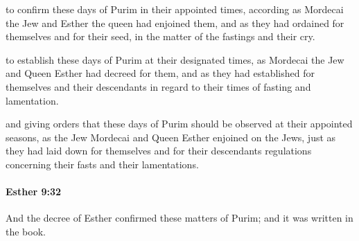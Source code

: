 			\begin{versebox}
					\item[BHS] 
					\item[LXX] 
					\item[ASV] to confirm these days of Purim in their appointed times, according as Mordecai the Jew and Esther the queen had enjoined them, and as they had ordained for themselves and for their seed, in the matter of the fastings and their cry.
					\item[NIV] to establish these days of Purim at their designated times, as Mordecai the Jew and Queen Esther had decreed for them, and as they had established for themselves and their descendants in regard to their times of fasting and lamentation.
					\item[NRSV] and giving orders that these days of Purim should be observed at their appointed seasons, as the Jew Mordecai and Queen Esther enjoined on the Jews, just as they had laid down for themselves and for their descendants regulations concerning their fasts and their lamentations.
			\end{versebox}

		\paragraph{Esther 9:32} %
			\label{ESTHER-9-32}

			And the decree of Esther confirmed these matters of Purim; and it was written in the book.

